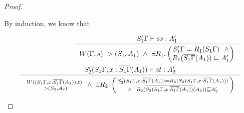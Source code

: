 \begin{proof}
\begin{itemize}
	By induction, we know that \vspace*{-2em}
	\begin{singlespace}
	\begin{align}
	\label{WcompleteLetsCase1}
	\inference{S_1'\Gamma |-s s : A_1'}{
	W(\Gamma,s) ~> (S_1,A_1)
	~\land~
	\exists R_1.
		\left(\begin{matrix}
			S_1'\Gamma=R_1(S_1\Gamma) ~~ \land \\
			R_1(\overline{S_1\Gamma}(A_1)) \sqsubseteq A_1'
		\end{matrix}\right) }
	\\
	\label{WcompleteLetsCase2}
	\inference{S_2'(S_1\Gamma,x:\overline{S_1\Gamma}(A_1)) |-s t : A_2'}{
	\begin{smallmatrix} W((S_1\Gamma,x:\overline{S_1\Gamma}(A_1)),t) \\
		~> (S_2,A_2)
	\end{smallmatrix}
	~\land~
	\exists R_2.
		\left(\begin{smallmatrix}
			S_2'(S_1\Gamma,x:\overline{S_1\Gamma}(A_1))=R_2(S_2(S_1\Gamma,x:\overline{S_1\Gamma}(A_1))) \\ \land ~~
			R_2(\overline{S_2(S_1\Gamma,x:\overline{S_1\Gamma}(A_1))}(A_2))
			\sqsubseteq A_2'
		\end{smallmatrix}\right) }
	\end{align}
	\end{singlespace}


\end{itemize}
\end{proof}
